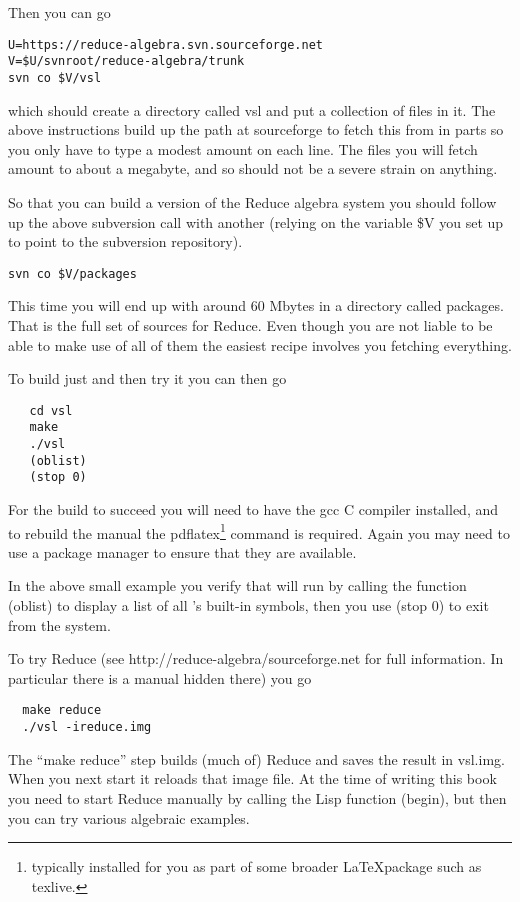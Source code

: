 Then you can go
{\small\begin{verbatim}
U=https://reduce-algebra.svn.sourceforge.net
V=$U/svnroot/reduce-algebra/trunk
svn co $V/vsl
\end{verbatim}}
which should create a directory called {\tx vsl} and put a collection of
files in it. The above instructions build up the path at {\tx sourceforge}
to fetch this from in parts so you only have to type a modest
amount on each line. The files you will fetch amount to about a megabyte,
and so should not be a severe strain on anything.

So that you can build a version of the Reduce algebra
system you should follow up the above subversion call with another (relying
on the variable {\tx \$V} you set up to point to the subversion repository).
{\small\begin{verbatim}
svn co $V/packages
\end{verbatim}}
This time you will end up with around 60 Mbytes in a directory called
{\tx packages}. That is the full set of sources for Reduce. Even though you
are not liable to be able to make use of all of them the easiest recipe
involves you fetching everything.

To build just \vsl{} and then try it you can then go
{\small\begin{verbatim}
   cd vsl
   make
   ./vsl
   (oblist)
   (stop 0)
\end{verbatim}}

For the build to succeed you will need to have the {\tx gcc} C compiler
installed, and to rebuild the manual the {\tx pdflatex}\footnote{typically
installed for you as part of some broader \LaTeX package such as texlive.}
command is required. Again you may need to use a package manager to ensure
that they are available.

In the above small example you verify that \vsl{} will run by calling the
function {\tx (oblist)} to display a list of all \vsl's built-in
symbols, then you use {\tx (stop 0)} to exit from the system.

To try Reduce (see {\tx http://reduce-algebra/sourceforge.net} for
full information. In particular there is a manual hidden there) you go
{\small\begin{verbatim}
  make reduce
  ./vsl -ireduce.img
\end{verbatim}}

The ``{\tx make reduce}'' step builds (much of) Reduce and saves
the result in {\tx vsl.img}. When you next start \vsl it reloads that
image file. At the time of writing this book you need to start Reduce
manually by calling the Lisp function {\tx (begin)}, but then you can
try various algebraic examples.

